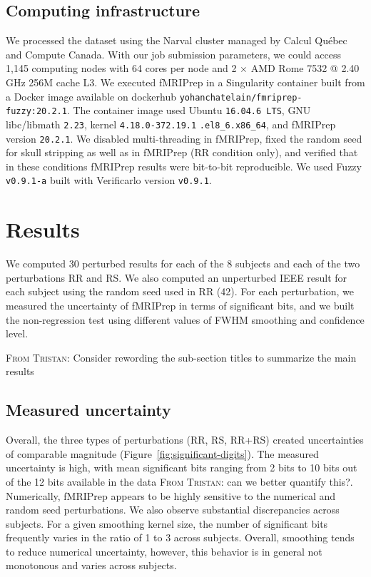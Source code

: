 \documentclass{article}
\newcommand{\TG}[1]{\color{blue}\textsc{From Tristan:} #1\color{black}\xspace}
\newcommand{\fmriprep}{fMRIPrep\xspace}
\begin{document}
\subsection{Computing infrastructure}

We processed the dataset using the Narval cluster managed by Calcul Qu\'ebec and Compute Canada. With our job submission parameters, we could access 1,145 computing nodes with 64 cores per node and 2 $\times$ AMD Rome 7532 @ 2.40 GHz 256M cache L3. We executed \fmriprep in a Singularity container built from a Docker image available on dockerhub \texttt{yohanchatelain/fmriprep-fuzzy:20.2.1}. The container image used Ubuntu \texttt{16.04.6 LTS}, GNU libc/libmath \texttt{2.23}, kernel \texttt{4.18.0-372.19.1} \texttt{.el8\_6.x86\_64}, and fMRIPrep version \texttt{20.2.1}. We disabled multi-threading in fMRIPrep, fixed the random seed for skull stripping as well as in fMRIPrep (RR condition only), and verified that in these conditions fMRIPrep results were bit-to-bit reproducible.
We used Fuzzy \texttt{v0.9.1-a} built with Verificarlo version \texttt{v0.9.1}.

\section{Results}

We computed 30 perturbed results for each of the 8 subjects and each of the two perturbations RR and RS. We also computed an unperturbed IEEE result for each subject using the
random seed used in RR (42). For each perturbation, we measured the uncertainty of fMRIPrep in terms of significant bits, and we built the non-regression test using different values of FWHM smoothing and confidence level.

\TG{Consider rewording the sub-section titles to summarize the main results}

\subsection{Measured uncertainty}

Overall, the three types of perturbations (RR, RS, RR+RS) created uncertainties of comparable magnitude (Figure~\ref{fig:significant-digits}). The measured uncertainty is high, with mean significant bits ranging from 2 bits to 10 bits out of the 12 bits available in the data \TG{can we better quantify this?}. Numerically, \fmriprep appears to be highly sensitive to the numerical and random seed perturbations. We also observe substantial discrepancies across subjects. For a given smoothing kernel size, the number of significant bits frequently varies in the ratio of 1 to 3 across subjects. Overall, smoothing tends to reduce numerical uncertainty, however, this behavior is in general not monotonous and varies across subjects.
\end{document}
